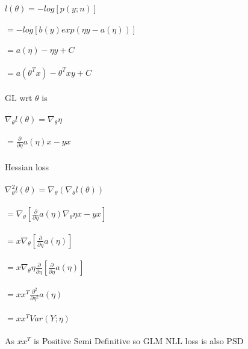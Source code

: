 \newcommand\tab[1][1cm]{\hspace*{#1}}
\begin{answer} 
\\ \\
\tab[2.25cm]$l(\theta) = -log[p(y;n)]$ \\ \\
\tab[3.25cm]$= -log[b(y)exp(\eta y-a(\eta))]$ \\ \\
\tab[3.25cm]$= a(\eta)-\eta y+C$ \\ \\
\tab[3.25cm]$= a(\theta^Tx)-\theta^Tx y+C$ \\ \\
GL wrt $\theta$ is \\ \\
\tab[2.25cm]$\nabla_\theta l (\theta) =\nabla_\theta \eta$ \\ \\
\tab[3.25cm]$= \frac{\partial}{\partial\eta}a(\eta)x -yx$ \\ \\
Hessian loss \\ \\
\tab[2.25cm]$\nabla^2_\theta l (\theta) = \nabla_\theta (\nabla_\theta l(\theta))$ \\ \\
\tab[3.25cm]$ = \nabla_\theta[\frac{\partial}{\partial\eta}a(\eta)\nabla_\theta \eta x -yx]$ \\ \\
\tab[3.25cm]$ = x\nabla_\theta[\frac{\partial}{\partial\eta}a(\eta)]$ \\ \\
\tab[3.25cm]$ = x\nabla_\theta \eta \frac{\partial}{\partial\eta}[\frac{\partial}{\partial\eta}a(\eta)]$ \\ \\
\tab[3.25cm]$ = xx^T \frac{\partial^2}{\partial\eta^2}a(\eta)$ \\ \\
\tab[3.25cm]$ = xx^T Var(Y;\eta)$ \\ \\
As $xx^T$ is Positive Semi Definitive so GLM NLL loss is also PSD
\end{answer}
